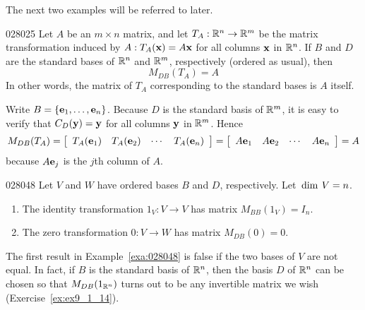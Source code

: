 \noindent The next two examples will be referred to later.


\begin{example}{}{028025}
Let $A$ be an $m \times n$ matrix, and let $T_{A} : \mathbb{R}^n \to \mathbb{R}^m$ be the matrix transformation induced by $A : T_{A}(\textbf{x}) = A\textbf{x}$ for all columns $\textbf{x}$ in $\mathbb{R}^n$. If $B$ and $D$ are the standard bases of $\mathbb{R}^n$ and $\mathbb{R}^m$, respectively (ordered as usual), then
\begin{equation*}
M_{DB}(T_A) = A
\end{equation*}
In other words, the matrix of $T_{A}$ corresponding to the standard bases is $A$ itself.


\begin{solution}
  Write $B = \{\textbf{e}_{1}, \dots, \textbf{e}_{n}\}$. Because $D$ is the standard basis of $\mathbb{R}^m$, it is easy to verify that $C_{D}(\textbf{y}) = \textbf{y}$ for all columns $\textbf{y}$ in $\mathbb{R}^m$. Hence
\begin{equation*}
M_{DB}(T_A) = \left[
\begin{array}{cccc}
T_A(\textbf{e}_1) & T_A(\textbf{e}_2) & \cdots & T_A(\textbf{e}_n) \end{array} \right] = \left[ \begin{array}{cccc} A\textbf{e}_1 & A\textbf{e}_2 & \cdots & A\textbf{e}_n \end{array} \right] = A
\end{equation*}
because $A\textbf{e}_{j}$ is the $j$th column of $A$.
\end{solution}
\end{example}

\begin{example}{}{028048}
Let $V$ and $W$ have ordered bases $B$ and $D$, respectively. Let $\thinspace\operatorname{dim \medspace}V = n$.


\begin{enumerate}
\item The identity transformation $1_{V} : V \to V$ has matrix $M_{BB}(1_{V}) = I_{n}$.

\item The zero transformation $0 : V \to W$ has matrix $M_{DB}(0) = 0$.

\end{enumerate}
\end{example}

\noindent The first result in Example~\ref{exa:028048} is false if the two bases of $V$ are not equal. In fact, if $B$ is the standard basis of $\mathbb{R}^n$, then the basis $D$ of $\mathbb{R}^n$ can be chosen so that $M_{DB}(1_{\mathbb{R}^n})$ turns out to be any invertible matrix we wish (Exercise~\ref{ex:ex9_1_14}).


